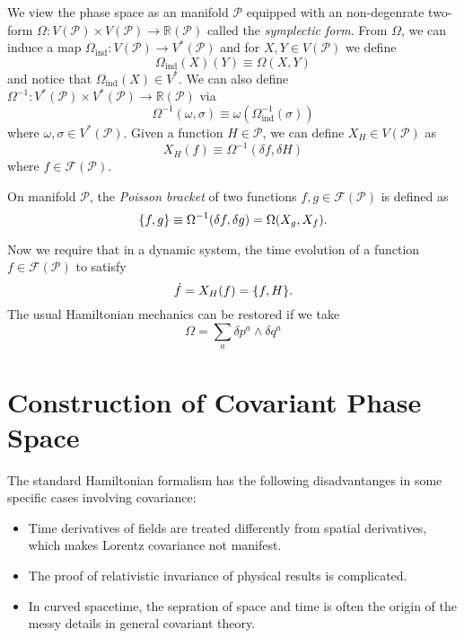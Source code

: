 \documentclass[10pt]{article}
\begin{document}
We view the phase space as an manifold $\mathcal{P}$ equipped with an non-degenrate two-form $\Omega:V(\mathcal{P})\times V(\mathcal{P})\to\mathbb{R}(\mathcal{P})$ called the \textit{symplectic form}.
From $\Omega$, we can induce a map $\Omega_{\text{ind}}:V(\mathcal{P})\to V^\ast(\mathcal{P})$ and for $X,Y\in V(\mathcal{P})$ we define
\begin{equation}
    \Omega_{\text{ind}}(X)(Y)\equiv\Omega(X,Y)
\end{equation}
and notice that $\Omega_{\text{ind}}(X)\in V^\ast$.
We can also define $\Omega^{-1}:V^\ast(\mathcal{P})\times V^\ast(\mathcal{P})\to \mathbb{R}(\mathcal{P})$ via
\begin{equation}
    \Omega^{-1}(\omega,\sigma)\equiv\omega(\Omega_{\text{ind}}^{-1}(\sigma))
\end{equation}
where $\omega,\sigma\in V^\ast(\mathcal{P})$.
Given a function $H\in\mathcal{P}$, we can define $X_H\in V(\mathcal{P})$ as
\begin{equation}
    X_H(f)\equiv\Omega^{-1}(\delta f,\delta H)
\end{equation}
where $f\in\mathcal{F}(\mathcal{P})$.

\begin{definition}
    On manifold $\mathcal{P}$, the \textit{Poisson bracket} of two functions  $f,g\in\mathcal{F}(\mathcal{P})$ is defined as
    \begin{equation}
        \pb{f}{g}\equiv\Omega^{-1}(\delta f,\delta g)=\Omega(X_g,X_f).
    \end{equation}
\end{definition}
Now we require that in a dynamic system, the time evolution of a function $f\in\mathcal{F}(\mathcal{P})$ to satisfy
\begin{equation}
    \dot{f}=X_H(f)=\pb{f}{H}.
\end{equation}
The usual Hamiltonian mechanics can be restored if we take
\begin{equation}
    \Omega=\sum_a \delta p^a\wedge \delta q^a
\end{equation}

\section{Construction of Covariant Phase Space}
The standard Hamiltonian formalism has the following disadvantanges in some specific cases involving covariance\cite{Gieres:2021ekc}:
\begin{itemize}
    \item Time derivatives of fields are treated differently from spatial derivatives, which makes Lorentz covariance not manifest.
    \item The proof of relativistic invariance of physical results is complicated.
    \item In curved spacetime, the sepration of space and time is often the origin of the messy details in general covariant theory.
\end{itemize}
\end{document}
